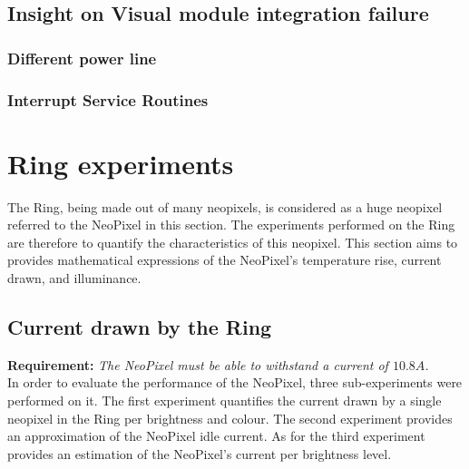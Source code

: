 \subsection{Insight on Visual module integration failure}\label{visual_fail}
\subsubsection{Different power line}
\subsubsection{Interrupt Service Routines}

\section{Ring experiments}
The Ring, being made out of many neopixels,  is considered as a huge neopixel referred to the NeoPixel in this section. The experiments performed on the Ring are therefore to quantify the characteristics of this neopixel. This section aims to provides mathematical expressions of the NeoPixel's temperature rise, current drawn, and illuminance.

\subsection{Current drawn by the Ring}
\textbf{Requirement:}  \textit{The NeoPixel must be able to withstand a current of $10.8A$.}\\
In order to evaluate the performance of the NeoPixel, three sub-experiments were performed on it. The first experiment quantifies the current drawn by a single neopixel in the Ring per brightness and colour. The second experiment provides an approximation of the NeoPixel idle current. As for the third experiment provides an estimation of the NeoPixel's current per brightness level.

